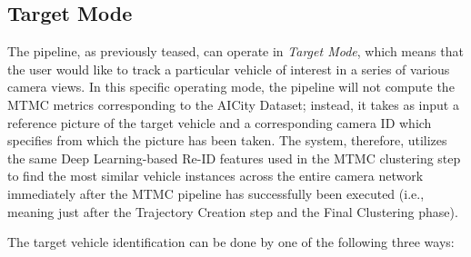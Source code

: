 \subsection{Target Mode}
The pipeline, as previously teased, can operate in \textit{Target Mode}, which means that the user would like to track a particular vehicle of interest in a series of various camera views. In this specific operating mode, the pipeline will not compute the MTMC metrics corresponding to the AICity Dataset; instead, it takes as input a reference picture of the target vehicle and a corresponding camera ID which specifies from which the picture has been taken. The system, therefore, utilizes the same Deep Learning-based Re-ID features used in the MTMC clustering step to find the most similar vehicle instances across the entire camera network immediately after the MTMC pipeline has successfully been executed (i.e., meaning just after the Trajectory Creation step and the Final Clustering phase).

The target vehicle identification can be done by one of the following three ways:

